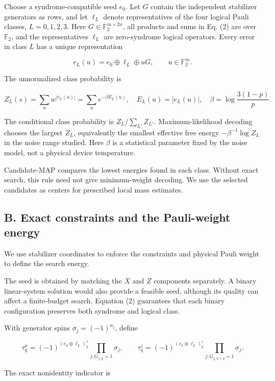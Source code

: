 \documentclass[
  10pt,
]{article}
\begin{document}
Choose a syndrome-compatible seed \(e_0\). Let \(G\) contain the
independent stabilizer generators as rows, and let \(\ell_L\) denote
representatives of the four logical Pauli classes, \(L=0,1,2,3\). Here
\(G\in\mathbb F_2^{m\times2n}\), all products and sums in Eq. (2) are
over \(\mathbb F_2\), and the representatives \(\ell_L\) are
zero-syndrome logical operators. Every error in class \(L\) has a unique
representation

\[
e_L(u)=e_0\oplus\ell_L\oplus uG,\qquad u\in\mathbb F_2^m.
\tag{2}\label{eq:2}
\]

The unnormalized class probability is

\[
Z_L(s)=\sum_u w^{|e_L(u)|}
=\sum_u e^{-\beta E_L(u)},\quad
E_L(u)=|e_L(u)|,\quad \beta=\log\frac{3(1-p)}p.
\tag{3}\label{eq:3}
\]

The conditional class probability is \(Z_L/\sum_{L'}Z_{L'}\).
Maximum-likelihood decoding chooses the largest \(Z_L\), equivalently
the smallest effective free energy \(-\beta^{-1}\log Z_L\) in the noise
range studied. Here \(\beta\) is a statistical parameter fixed by the
noise model, not a physical device temperature.

Candidate-MAP compares the lowest energies found in each class. Without
exact search, this rule need not give minimum-weight decoding. We use
the selected candidates as centers for prescribed local mass estimates.

\subsection{B. Exact constraints and the Pauli-weight
energy}\label{b.-exact-constraints-and-the-pauli-weight-energy}

We use stabilizer coordinates to enforce the constraints and physical
Pauli weight to define the search energy.

The seed is obtained by matching the \(X\) and \(Z\) components
separately. A binary linear-system solution would also provide a
feasible seed, although its quality can affect a finite-budget search.
Equation (2) guarantees that each binary configuration preserves both
syndrome and logical class.

With generator spins \(\sigma_j=(-1)^{u_j}\), define

\[
\tau_q^x=(-1)^{(e_0\oplus\ell_L)_q^x}
\prod_{j:G_{j,q}=1}\sigma_j,
\qquad
\tau_q^z=(-1)^{(e_0\oplus\ell_L)_q^z}
\prod_{j:G_{j,n+q}=1}\sigma_j.
\]

The exact nonidentity indicator is
\end{document}
